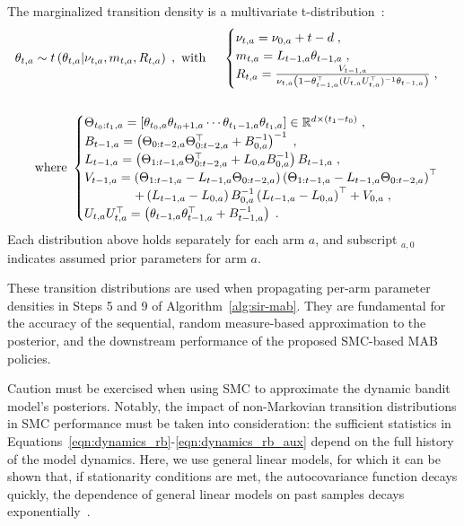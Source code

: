 The marginalized transition density is a multivariate t-distribution~\citep{j-Geisser1963,j-Tiao1964,j-Geisser1965,j-Urteaga2016,j-Urteaga2016a}:
\begin{align}
\theta_{t,a} \sim t\left( \theta_{t,a}|\nu_{t,a}, m_{t,a}, R_{t,a}\right) \;, \text{ with } \quad
\begin{cases}
\nu_{t,a}=\nu_{0,a}+t-d \; ,\\
m_{t,a}=L_{t-1,a} \theta_{t-1,a} \; , \\
R_{t,a} = \frac{V_{t-1,a}}{\nu_{t,a}\left(1-\theta_{t-1,a}^\top(U_{t,a} U_{t,a}^\top)^{-1}\theta_{t-1,a}\right)} \; ,\\
\end{cases} 
\label{eqn:dynamics_rb} \\
\nonumber \\
\text{where } \begin{cases}
\Theta_{t_0:t_1,a}=[\theta_{t_0,a} \theta_{t_0+1,a} \cdots \theta_{t_1-1,a} \theta_{t_1,a}] \in {\mathbb R}^{d\times (t_1-t_0)} \; , \\
B_{t-1,a} = \left(\Theta_{0:t-2,a}\Theta_{0:t-2,a}^\top + B_{0,a}^{-1} \right)^{-1} \; ,\\
L_{t-1,a} = \left(\Theta_{1:t-1,a}\Theta_{0:t-2,a}^\top + L_{0,a}B_{0,a}^{-1}\right) B_{t-1,a} \; ,\\
V_{t-1,a}= \left(\Theta_{1:t-1,a}-L_{t-1,a} \Theta_{0:t-2,a}\right)\left(\Theta_{1:t-1,a}-L_{t-1,a} \Theta_{0:t-2,a}\right)^\top \\
\qquad \qquad + \left(L_{t-1,a}-L_{0,a}\right) B_{0,a}^{-1} \left(L_{t-1,a}-L_{0,a}\right)^\top + V_{0,a} \; ,\\
U_{t,a} U_{t,a}^\top = \left(\theta_{t-1,a}\theta_{t-1,a}^\top+B_{t-1,a}^{-1}\right) \; .\\
\end{cases}
\label{eqn:dynamics_rb_aux}
\end{align}
Each distribution above holds separately for each arm $a$, and subscript $_{a,0}$ indicates assumed prior parameters for arm $a$.

These transition distributions are used when propagating per-arm parameter densities in Steps 5 and 9 of Algorithm~\ref{alg:sir-mab}.
They are fundamental for the accuracy of the sequential, random measure-based approximation to the posterior,
and the downstream performance of the proposed SMC-based MAB policies.

Caution must be exercised when using SMC to approximate the dynamic bandit model's posteriors.
Notably, the impact of non-Markovian transition distributions in SMC performance must be taken into consideration:
the sufficient statistics in Equations~\eqref{eqn:dynamics_rb}-\eqref{eqn:dynamics_rb_aux} depend on the full history of the model dynamics.
Here, we use general linear models,
for which it can be shown that, if stationarity conditions are met,
the autocovariance function decays quickly,
\ie the dependence of general linear models on past samples decays exponentially~\citep{j-Urteaga2016,j-Urteaga2016a}.

